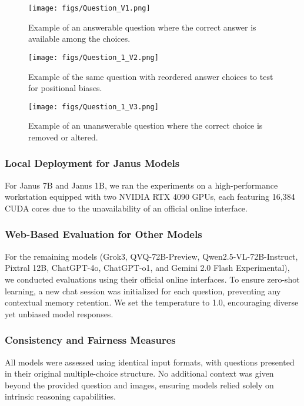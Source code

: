 \begin{figure}[h]
    \centering
    \texttt{[image: figs/Question\_V1.png]}
    \caption{Example of an answerable question where the correct answer is available among the choices.}
    \label{fig:answerable}
\end{figure}

\begin{figure}[h]
    \centering
    \texttt{[image: figs/Question\_1\_V2.png]}
    \caption{Example of the same question with reordered answer choices to test for positional biases.}
    \label{fig:reordered}
\end{figure}

\begin{figure}[h]
    \centering
    \texttt{[image: figs/Question\_1\_V3.png]}
    \caption{Example of an unanswerable question where the correct choice is removed or altered.}
    \label{fig:unanswerable}
\end{figure}



\subsubsection{Local Deployment for Janus Models} 
For Janus 7B and Janus 1B, we ran the experiments on a high-performance workstation equipped with two NVIDIA RTX 4090 GPUs, each featuring 16,384 CUDA cores due to the unavailability of an official online interface.

\subsubsection{Web-Based Evaluation for Other Models} 
For the remaining models (Grok3, QVQ-72B-Preview, Qwen2.5-VL-72B-Instruct, Pixtral 12B, ChatGPT-4o, ChatGPT-o1, and Gemini 2.0 Flash Experimental), we conducted evaluations using their official online interfaces. To ensure zero-shot learning, a new chat session was initialized for each question, preventing any contextual memory retention. We set the temperature to 1.0, encouraging diverse yet unbiased model responses.

\subsubsection{Consistency and Fairness Measures}
All models were assessed using identical input formats, with questions presented in their original multiple-choice structure. No additional context was given beyond the provided question and images, ensuring models relied solely on intrinsic reasoning capabilities.

